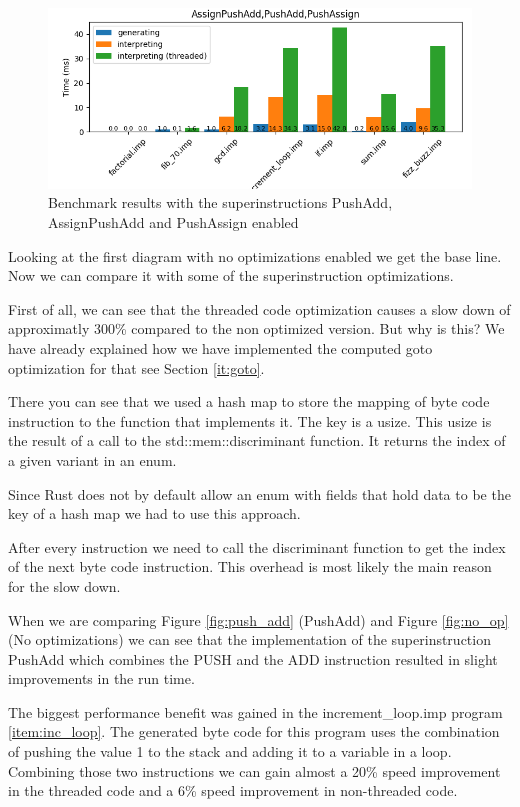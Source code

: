 \documentclass{article}
\begin{document}
\begin{figure}[h]
    \centering
    \includegraphics[width=1\textwidth]{../BenchmarkImages/AssignPushAdd_PushAdd_PushAssign.png}
    \caption{Benchmark results with the superinstructions PushAdd, AssignPushAdd and PushAssign enabled}
    \label{fig:all_op}
\end{figure}

Looking at the first diagram with no optimizations enabled we get the base
line. Now we can compare it with some of the superinstruction optimizations.

First of all, we can see that the threaded code optimization causes a slow down
of approximatly 300\% compared to the non optimized version. But why is this?
We have already explained how we have implemented the computed goto
optimization for that see Section \ref{it:goto}.

There you can see that we used a hash map to store the mapping of byte code
instruction to the function that implements it. The key is a usize. This usize
is the result of a call to the std::mem::discriminant function. It returns the
index of a given variant in an enum.

Since Rust does not by default allow an enum with fields that hold data to be
the key of a hash map we had to use this approach.

After every instruction we need to call the discriminant function to get the
index of the next byte code instruction. This overhead is most likely the main
reason for the slow down.

When we are comparing Figure \ref{fig:push_add} (PushAdd) and Figure
\ref{fig:no_op} (No optimizations) we can see that the implementation of the
superinstruction PushAdd which combines the PUSH and the ADD instruction
resulted in slight improvements in the run time.

The biggest performance benefit was gained in the increment\_loop.imp program
\ref{item:inc_loop}. The generated byte code for this program uses the
combination of pushing the value 1 to the stack and adding it to a variable in
a loop. Combining those two instructions we can gain almost a 20\% speed
improvement in the threaded code and a 6\% speed improvement in non-threaded
code.
\end{document}
